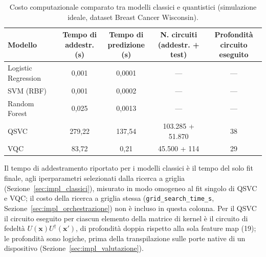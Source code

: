 \begin{table}[htbp]
\centering
\caption{Costo computazionale comparato tra modelli classici e quantistici (simulazione ideale, dataset Breast Cancer Wisconsin).}
\label{tab:costo_computazionale}
{\renewcommand{\arraystretch}{1.5} %
\footnotesize
\setlength{\tabcolsep}{4pt}
\begin{tabular}{>{\raggedright\arraybackslash}p{2.2cm}cccc}
\toprule
\textbf{Modello} & \thead{\textbf{Tempo di}\\\textbf{addestr. (s)}} & \thead{\textbf{Tempo di}\\\textbf{predizione (s)}} & \thead{\textbf{N. circuiti}\\\textbf{(addestr. + test)}} & \thead{\textbf{Profondità}\\\textbf{circuito eseguito}} \\
\midrule
Logistic Regression & 0,001 & 0,0001 & --- & --- \\
SVM (RBF) & 0,001 & 0,0002 & --- & --- \\
Random Forest & 0,025 & 0,0013 & --- & --- \\
QSVC & 279,22 & 137,54 & 103.285 + 51.870 & 38 \\
VQC & 83,72 & 0,21 & 45.500 + 114 & 29 \\
\bottomrule
\end{tabular}
}

\medskip
{\footnotesize Il tempo di addestramento riportato per i modelli classici è il tempo del solo fit finale, agli iperparametri selezionati dalla ricerca a griglia (Sezione~\ref{sec:impl_classici}), misurato in modo omogeneo al fit singolo di QSVC e VQC; il costo della ricerca a griglia stessa (\texttt{grid\_search\_time\_s}, Sezione~\ref{sec:impl_orchestrazione}) non è incluso in questa colonna. Per il QSVC il circuito eseguito per ciascun elemento della matrice di kernel è il circuito di fedeltà $U(\mathbf{x})U^\dagger(\mathbf{x}')$, di profondità doppia rispetto alla sola feature map (19); le profondità sono logiche, prima della transpilazione sulle porte native di un dispositivo (Sezione~\ref{sec:impl_valutazione}).}
\end{table}

